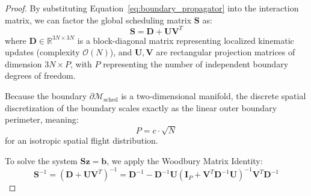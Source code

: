 \documentclass[11pt,a4paper]{book}
\begin{document}
\begin{proof}
By substituting Equation~\eqref{eq:boundary_propagator} into the interaction matrix, we can factor the global scheduling matrix $\mathbf{S}$ as:
\begin{equation}
\label{eq:holographic_factorization}
\mathbf{S} = \mathbf{D} + \mathbf{U} \mathbf{V}^T
\end{equation}
where $\mathbf{D} \in \mathbb{R}^{3N \times 3N}$ is a block-diagonal matrix representing localized kinematic updates (complexity $\mathcal{O}(N)$), and $\mathbf{U}, \mathbf{V}$ are rectangular projection matrices of dimension $3N \times P$, with $P$ representing the number of independent boundary degrees of freedom.

Because the boundary $\partial \mathcal{M}_{\text{sched}}$ is a two-dimensional manifold, the discrete spatial discretization of the boundary scales exactly as the linear outer boundary perimeter, meaning:
\begin{equation}
\label{eq:boundary_degrees}
P = c \cdot \sqrt{N}
\end{equation}
for an isotropic spatial flight distribution.

To solve the system $\mathbf{S} \mathbf{z} = \mathbf{b}$, we apply the Woodbury Matrix Identity:
\begin{equation}
\label{eq:woodbury_identity}
\mathbf{S}^{-1} = \left(\mathbf{D} + \mathbf{U} \mathbf{V}^T\right)^{-1} = \mathbf{D}^{-1} - \mathbf{D}^{-1} \mathbf{U} \left( \mathbf{I}_P + \mathbf{V}^T \mathbf{D}^{-1} \mathbf{U} \right)^{-1} \mathbf{V}^T \mathbf{D}^{-1}
\end{equation}


\end{proof}
\end{document}
